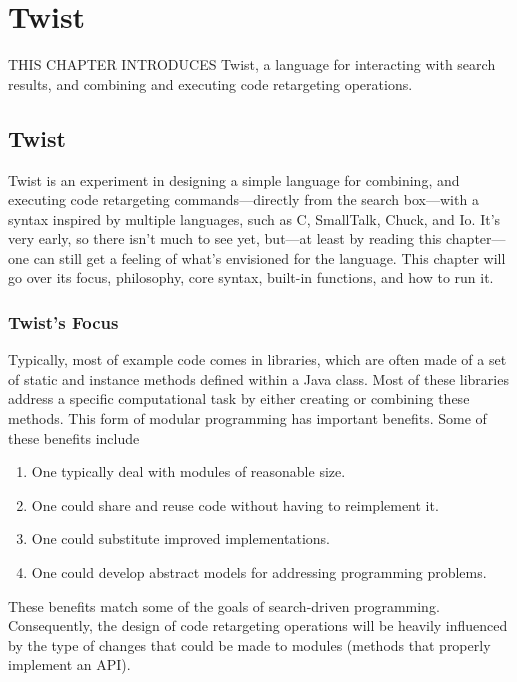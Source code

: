 \chapter{Twist}{}
\label{chap:twist}

\lettrine[lraise=0.1, nindent=0em, slope=-.5em]{T}{HIS CHAPTER INTRODUCES} Twist, a language for interacting with search results, and combining and executing code retargeting operations. 

\section{Twist}
\label{sec:twist}

Twist is an experiment in designing a simple language for combining, and executing code retargeting commands---directly from the search box---with a syntax inspired by multiple languages, such as C, SmallTalk, Chuck, and Io. It's very early, so there isn't much to see yet, but---at least by reading this chapter---one can still get a feeling of what's envisioned for the language. This chapter will go over its focus, philosophy, core syntax, built-in functions, and how to run it.

\subsection{Twist's Focus}
\label{sec:focus}

Typically, most of example code comes in libraries, which are often made of a set of static and instance methods defined within a Java class. Most of these libraries address a specific computational task by either creating or combining these methods. This form of modular programming has important benefits\cite{Sedgewick:2011tx}. Some of these benefits include 

\begin{enumerate}
	\item One typically deal with modules of reasonable size.
	\item One could share and reuse code without having to reimplement it.
	\item One could substitute improved implementations.
	\item One could develop abstract models for addressing programming problems.
\end{enumerate}

These benefits match some of the goals of search-driven programming. Consequently, the design of code retargeting operations will be heavily influenced by the type of changes that could be made to modules (methods that properly implement an API).

